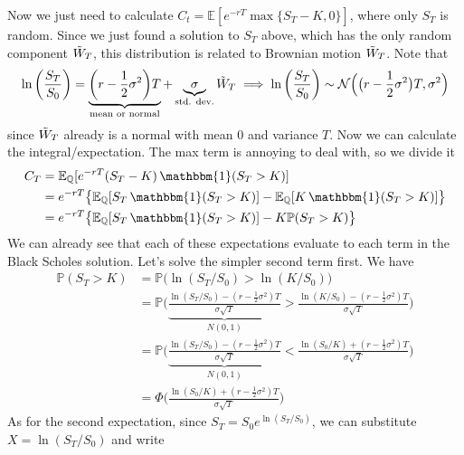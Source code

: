 \documentclass{article}
\begin{document}
    Now we just need to calculate $C_t = \mathbb{E} [ e^{-r T} \max \{S_T - K, 0\}]$, where only $S_T$ is random. Since we just found a solution to $S_T$ above, which has the only random component $\Tilde{W}_T$, this distribution is related to Brownian motion $\Tilde{W}_T$. Note that 
    \begin{equation}
      \ln \bigg( \frac{S_T}{S_0}\bigg) = \underbrace{\bigg( r - \frac{1}{2} \sigma^2 \bigg) T}_{\text{mean or normal}} + \underbrace{\sigma}_{\text{std. dev.}} \Tilde{W}_T \implies \ln \bigg( \frac{S_T}{S_0} \bigg) \sim \mathcal{N} \Big( \big( r - \frac{1}{2} \sigma^2 \big) T, \sigma^2 \Big) 
    \end{equation}
    since $\Tilde{W}_T$ already is a normal with mean $0$ and variance $T$. Now we can calculate the integral/expectation. The max term is annoying to deal with, so we divide it 
    \begin{align}
      C_T & = \mathbb{E}_{\mathbb{Q}} [ e^{-rT} (S_T - K) \, \mathbbm{1} (S_T > K)] \\
          & = e^{-r T} \big\{ \mathbb{E}_{\mathbb{Q}}[S_T \, \mathbbm{1} (S_T > K)] - \mathbb{E}_{\mathbb{Q}} [K \, \mathbbm{1}(S_T > K)] \big\} \\
          & = e^{-r T} \big\{ \mathbb{E}_{\mathbb{Q}}[S_T \, \mathbbm{1} (S_T > K)] - K \mathbb{P}(S_T > K) \big\}
    \end{align}
    We can already see that each of these expectations evaluate to each term in the Black Scholes solution. Let's solve the simpler second term first. We have 
    \begin{align}
      \mathbb{P}(S_T > K) & = \mathbb{P} \big( \ln(S_T / S_0) > \ln(K / S_0) \big) \\
                          & = \mathbb{P} \bigg( \underbrace{\frac{\ln(S_T / S_0) - (r - \frac{1}{2} \sigma^2) T}{\sigma \sqrt{T}}}_{N(0, 1)} > \frac{\ln(K /S_0) - (r - \frac{1}{2} \sigma^2) T}{\sigma \sqrt{T}} \bigg)  \\
                          & = \mathbb{P} \bigg( \underbrace{\frac{\ln(S_T / S_0) - (r - \frac{1}{2} \sigma^2) T}{\sigma \sqrt{T}}}_{N(0, 1)} < \frac{\ln(S_0/K) + (r - \frac{1}{2} \sigma^2) T}{\sigma \sqrt{T}} \bigg)  \\
                          & = \Phi \bigg( \frac{\ln(S_0 /K) + (r - \frac{1}{2} \sigma^2) T}{\sigma \sqrt{T}} \bigg)
    \end{align}
    As for the second expectation, since $S_T = S_0 e^{\ln (S_T / S_0)}$, we can substitute $X = \ln (S_T / S_0)$ and write 
\end{document}
